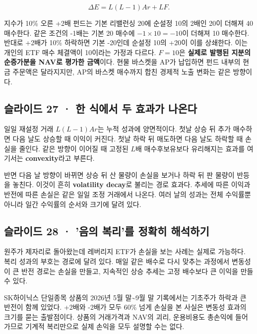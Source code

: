 \documentclass[11pt,a4paper]{article}
\begin{document}
\[
\Delta E=L(L-1)Ar+LF.
\]

지수가 10\% 오른 +2배 펀드는 기본 리밸런싱 20에 순설정 10의 2배인 20이 더해져 40 매수한다. 같은 조건의 -1배는 기본 20 매수에 $-1\times10=-10$이 더해져 10 매수한다. 반대로 +2배가 10\% 하락하면 기본 -20인데 순설정 10의 +20이 이를 상쇄한다. 이는 개인의 ETF 매수 체결액이 10이라는 가정과 다르다. $F=10$은 \textbf{실제로 발행된 지분의 순증가분을 NAV로 평가한 금액}이다. 현물 바스켓을 AP가 납입하면 펀드 내부의 현금 주문액은 달라지지만, AP의 바스켓 매수까지 합친 경제적 노출 변화는 같은 방향이다.\par

\subsection{슬라이드 27 · 한 식에서 두 효과가 나온다}
일일 재설정 거래 $L(L-1)Ar$는 누적 성과에 양면적이다. 첫날 상승 뒤 추가 매수하면 다음 날도 상승할 때 이익이 커진다. 첫날 하락 뒤 매도하면 다음 날도 하락할 때 손실을 줄인다. 같은 방향이 이어질 때 고정된 $L$배 매수후보유보다 유리해지는 효과를 여기서는 \textbf{convexity}라고 부른다.\par

반면 다음 날 방향이 바뀌면 상승 뒤 산 물량이 손실을 보거나 하락 뒤 판 물량이 반등을 놓친다. 이것이 흔히 \textbf{volatility decay}로 불리는 경로 효과다. 추세에 따른 이익과 반전에 따른 손실은 같은 일일 조정 거래에서 나온다. 여러 날의 성과는 전체 수익률뿐 아니라 일간 수익률의 순서와 크기에 달려 있다.\par

\subsection{슬라이드 28 · '음의 복리'를 정확히 해석하기}
원주가 제자리로 돌아왔는데 레버리지 ETF가 손실을 보는 사례는 실제로 가능하다. 복리 성과의 부호는 경로에 달려 있다. 매일 같은 배수로 다시 맞추는 과정에서 변동성이 큰 반전 경로는 손실을 만들고, 지속적인 상승 추세는 고정 배수보다 큰 이익을 만들 수 있다.\par

SK하이닉스 단일종목 상품의 2026년 5월 말\~{}9월 말 기록에서는 기초주가 하락과 큰 반전이 함께 있었다. +2배와 -2배가 모두 60\% 넘게 손실을 본 사실은 변동성 효과의 크기를 묻는 출발점이다. 상품의 거래가격과 NAV의 괴리, 운용비용도 총손익에 들어가므로 기계적 복리만으로 실제 손익을 모두 설명할 수는 없다.\par
\end{document}
